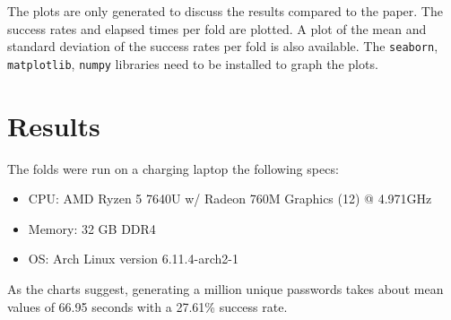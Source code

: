 The plots are only generated to discuss the results compared to the paper. The success rates and elapsed times per fold are plotted. A plot of the mean and standard deviation of the success rates per fold is also available. The \verb|seaborn|, \verb|matplotlib|, \verb|numpy| libraries need to be installed to graph the plots. 

\section{Results}
The folds were run on a charging laptop the following specs:
\begin{itemize}
  \item CPU: AMD Ryzen 5 7640U w/ Radeon 760M Graphics (12) @ 4.971GHz
  \item Memory: 32 GB DDR4
  \item OS: Arch Linux version 6.11.4-arch2-1
\end{itemize}

As the charts suggest, generating a million unique passwords takes about mean values of 66.95 seconds with a 27.61\% success rate.


